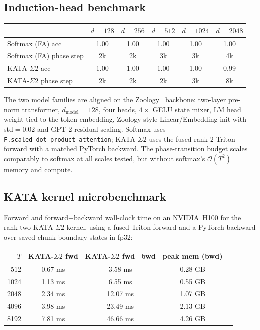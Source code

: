 \documentclass{article}
\newcommand{\1}{\bm{1}}
\def\gO{{\mathcal{O}}}
\newcommand{\seql}{T}
\theoremstyle{definition}
\begin{document}
\subsection{Induction-head benchmark}
\label{app:induction}

\begin{center}\small
  \begin{tabular}{l|ccccc}
    \toprule
                            & $d{=}128$ & $d{=}256$ & $d{=}512$ & $d{=}1024$ & $d{=}2048$ \\
    \midrule
    Softmax (FA) acc        & 1.00      & 1.00      & 1.00      & 1.00       & 1.00       \\
    Softmax (FA) phase step & 2k        & 2k        & 3k        & 3k         & 4k         \\
    \midrule
    KATA-$\Sigma2$ acc              & 1.00      & 1.00      & 1.00      & 1.00       & 0.99       \\
    KATA-$\Sigma2$ phase step       & 2k        & 2k        & 2k        & 3k         & 8k         \\
    \bottomrule
  \end{tabular}
\end{center}

The two model families are aligned on the Zoology~\citep{arora23zoology} backbone: two-layer
pre-norm transformer, $d_\text{model}{=}128$, four heads, $4{\times}$ GELU state mixer, LM head
weight-tied to the token embedding, Zoology-style Linear/Embedding init with std$=0.02$ and GPT-2
residual scaling. Softmax uses \texttt{F.scaled\_dot\_product\_attention}; KATA-$\Sigma2$ uses the fused
rank-2 Triton forward with a matched PyTorch backward. The phase-transition budget scales
comparably to softmax at all scales tested, but without softmax's $\gO(\seql^2)$ memory and compute.

\subsection{KATA kernel microbenchmark}
\label{app:hardware-bench}

Forward and forward+backward wall-clock time on an NVIDIA~H100 for the rank-two KATA-$\Sigma2$
kernel, using a fused Triton forward and a PyTorch backward over saved chunk-boundary states in
fp32:

\begin{center}\small
  \begin{tabular}{r|cccc}
    \toprule
    $\seql$  & KATA-$\Sigma2$ fwd & KATA-$\Sigma2$ fwd+bwd & peak mem (bwd) \\
    \midrule
    512  & 0.67 ms    & 3.58 ms        & 0.28 GB        \\
    1024 & 1.13 ms    & 6.55 ms        & 0.55 GB        \\
    2048 & 2.34 ms    & 12.07 ms       & 1.07 GB        \\
    4096 & 3.98 ms    & 23.49 ms       & 2.13 GB        \\
    8192 & 7.81 ms    & 46.66 ms       & 4.26 GB        \\
    \bottomrule
  \end{tabular}
\end{center}
\end{document}

